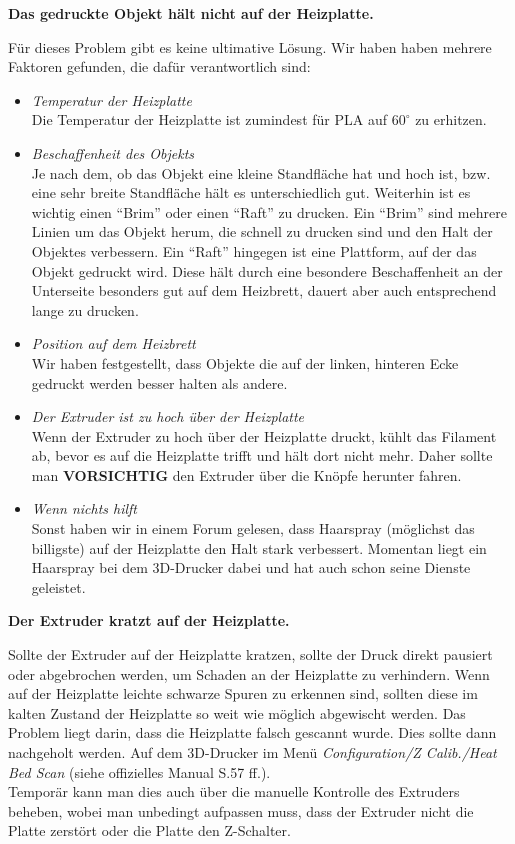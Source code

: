 \documentclass[11pt,a4paper]{scrartcl}
\begin{document}
\begin{description}
\item \textbf{Das gedruckte Objekt hält nicht auf der Heizplatte.}\\
Für dieses Problem gibt es keine ultimative Lösung. Wir haben haben mehrere Faktoren gefunden, die dafür verantwortlich sind:
\begin{itemize}
\item \textit{Temperatur der Heizplatte}\\
Die Temperatur der Heizplatte ist zumindest für PLA auf $60^\circ$ zu erhitzen.
\item \textit{Beschaffenheit des Objekts}\\
Je nach dem, ob das Objekt eine kleine Standfläche hat und hoch ist, bzw. eine sehr breite Standfläche hält es unterschiedlich gut. Weiterhin ist es wichtig einen \enquote{Brim} oder einen \enquote{Raft} zu drucken. Ein \enquote{Brim} sind mehrere Linien um das Objekt herum, die schnell zu drucken sind und den Halt der Objektes verbessern. Ein \enquote{Raft} hingegen ist eine Plattform, auf der das Objekt gedruckt wird. Diese hält durch eine besondere Beschaffenheit an der Unterseite besonders gut auf dem Heizbrett, dauert aber auch entsprechend lange zu drucken.
\item \textit{Position auf dem Heizbrett}\\
Wir haben festgestellt, dass Objekte die auf der linken, hinteren Ecke gedruckt werden besser halten als andere.
\item \textit{Der Extruder ist zu hoch über der Heizplatte}\\
Wenn der Extruder zu hoch über der Heizplatte druckt, kühlt das Filament ab, bevor es auf die Heizplatte trifft und hält dort nicht mehr. Daher sollte man \textbf{VORSICHTIG} den Extruder über die Knöpfe herunter fahren.
\item \textit{Wenn nichts hilft}\\
Sonst haben wir in einem Forum gelesen, dass Haarspray (möglichst das billigste) auf der Heizplatte den Halt stark verbessert. Momentan liegt ein Haarspray bei dem 3D-Drucker dabei und hat auch schon seine Dienste geleistet.
\end{itemize}

\item \textbf{Der Extruder kratzt auf der Heizplatte.}\\
Sollte der Extruder auf der Heizplatte kratzen, sollte der Druck direkt pausiert oder abgebrochen werden, um Schaden an der Heizplatte zu verhindern. Wenn auf der Heizplatte leichte schwarze Spuren zu erkennen sind, sollten diese im kalten Zustand der Heizplatte so weit wie möglich abgewischt werden. Das Problem liegt darin, dass die Heizplatte falsch gescannt wurde. Dies sollte dann nachgeholt werden. Auf dem 3D-Drucker im Menü \textit{Configuration/Z Calib./Heat Bed Scan} (siehe offizielles Manual S.57 ff.).\\
Temporär kann man dies auch über die manuelle Kontrolle des Extruders beheben, wobei man unbedingt aufpassen muss, dass der Extruder nicht die Platte zerstört oder die Platte den Z-Schalter.


\end{description}
\end{document}
